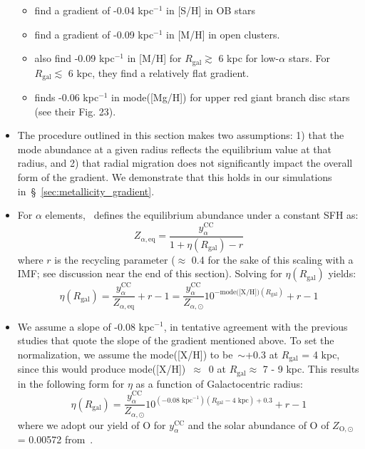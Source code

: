 \documentclass[fleqn, usenatbib]{mnras}
\begin{document}
\begin{itemize}
\begin{itemize}
		\item \citet{Daflon2009} find a gradient of -0.04 kpc$^{-1}$ in 
		[S/H] in OB stars 

		\item \citet{Frinchaboy2013} find a gradient of -0.09 kpc$^{-1}$ in 
		[M/H] in open clusters. 

		\item \citet{Hayden2014} also find -0.09 kpc$^{-1}$ in [M/H] for 
		$R_\text{gal}\gtrsim$ 6 kpc for low-$\alpha$ stars. For 
		$R_\text{gal}\lesssim$ 6 kpc, they find a relatively flat gradient. 

		\item \citet{Weinberg2019} finds -0.06 kpc$^{-1}$ in mode([Mg/H]) for 
		upper red giant branch disc stars (see their Fig. 23). 
	\end{itemize} 

	\item The procedure outlined in this section makes two assumptions: 1) 
	that the mode abundance at a given radius reflects the equilibrium 
	value at that radius, and 2) that radial migration does not significantly 
	impact the overall form of the gradient. We demonstrate that this holds in 
	our simulations in~\S~\ref{sec:metallicity_gradient}. 

	\item For $\alpha$ elements,~\citet{Weinberg2017} defines the equilibrium 
	abundance under a constant SFH as: 
	\begin{equation} 
	Z_{\alpha,\text{eq}} = \frac{
		y_\alpha^\text{CC}
	}{
		1 + \eta(R_\text{gal}) - r
	} 
	\end{equation} 
	where $r$ is the recycling parameter ($\approx$ 0.4 for the sake of this 
	scaling with a~ IMF; see discussion near the end of 
	this section). Solving for $\eta(R_\text{gal})$ yields: 
	\begin{equation} 
	\eta(R_\text{gal}) = \frac{
		y_\alpha^\text{CC}
	}{
		Z_{\alpha,\text{eq}}
	} + r - 1 
	= \frac{y_\alpha^\text{CC}}{Z_{\alpha,\odot}}10^{-\text{mode([X/H])}
	(R_\text{gal})} + r - 1 
	\end{equation} 

	\item We assume a slope of -0.08 kpc$^{-1}$, in tentative agreement with 
	the previous studies that quote the slope of the gradient mentioned above. 
	To set the normalization, we assume the mode([X/H]) to be~$\sim$+0.3 at 
	$R_\text{gal}$ = 4 kpc, since this would produce mode([X/H])~$\approx$~0 at 
	$R_\text{gal}\approx$ 7 - 9 kpc. This results in the following form for 
	$\eta$ as a function of Galactocentric radius: 
	\begin{equation} 
	\eta(R_\text{gal}) = \frac{y_\alpha^\text{CC}}{Z_{\alpha,\odot}} 
	10^{(-0.08\text{ kpc}^{-1})(R_\text{gal} - \text{4 kpc}) + 0.3} + r - 1 
	\label{eq:eta} 
	\end{equation} 
	where we adopt our yield of O for $y_\alpha^\text{CC}$ and the solar 
	abundance of O of $Z_{\text{O},\odot}$ = 0.00572 from~\citet{Asplund2009}. 


\end{itemize}
\end{document}
